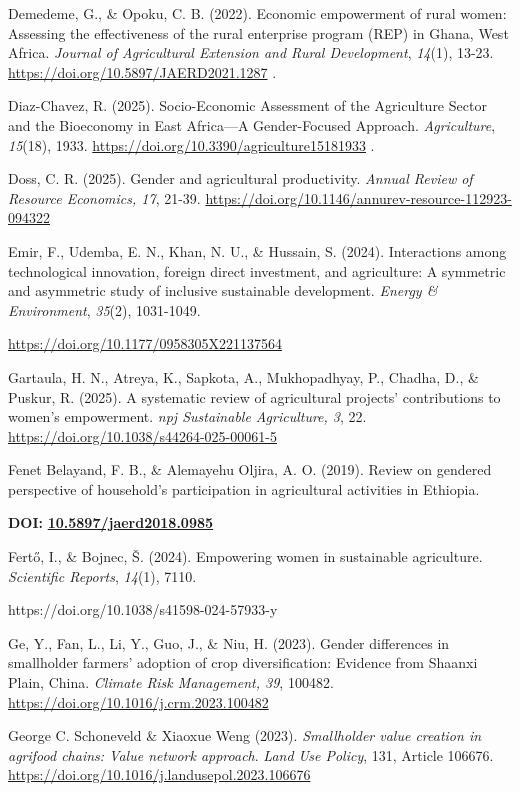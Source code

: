 \documentclass[
]{article}
\begin{document}
Demedeme, G., \& Opoku, C. B. (2022). Economic empowerment of rural
women: Assessing the effectiveness of the rural enterprise program (REP)
in Ghana, West Africa. \emph{Journal of Agricultural Extension and Rural
Development}, \emph{14}(1), 13-23.
\url{https://doi.org/10.5897/JAERD2021.1287} .

Diaz-Chavez, R. (2025). Socio-Economic Assessment of the Agriculture
Sector and the Bioeconomy in East Africa---A Gender-Focused Approach.
\emph{Agriculture}, \emph{15}(18), 1933.
\url{https://doi.org/10.3390/agriculture15181933} .

Doss, C. R. (2025). Gender and agricultural productivity. \emph{Annual
Review of Resource Economics, 17}, 21-39.
\url{https://doi.org/10.1146/annurev-resource-112923-094322}

Emir, F., Udemba, E. N., Khan, N. U., \& Hussain, S. (2024).
Interactions among technological innovation, foreign direct investment,
and agriculture: A symmetric and asymmetric study of inclusive
sustainable development. \emph{Energy \& Environment}, \emph{35}(2),
1031-1049.

\url{https://doi.org/10.1177/0958305X221137564}

Gartaula, H. N., Atreya, K., Sapkota, A., Mukhopadhyay, P., Chadha, D.,
\& Puskur, R. (2025). A systematic review of agricultural projects'
contributions to women's empowerment. \emph{npj Sustainable Agriculture,
3}, 22. \url{https://doi.org/10.1038/s44264-025-00061-5}

Fenet Belayand, F. B., \& Alemayehu Oljira, A. O. (2019). Review on
gendered perspective of household's participation in agricultural
activities in Ethiopia.

\textbf{DOI:}
\href{https://doi.org/10.5897/jaerd2018.0985}{\textbf{10.5897/jaerd2018.0985}}

Fertő, I., \& Bojnec, Š. (2024). Empowering women in sustainable
agriculture. \emph{Scientific Reports}, \emph{14}(1), 7110.

https://doi.org/10.1038/s41598-024-57933-y

Ge, Y., Fan, L., Li, Y., Guo, J., \& Niu, H. (2023). Gender differences
in smallholder farmers' adoption of crop diversification: Evidence from
Shaanxi Plain, China. \emph{Climate Risk Management, 39}, 100482.
\url{https://doi.org/10.1016/j.crm.2023.100482}

George C. Schoneveld \& Xiaoxue Weng (2023). \emph{Smallholder value
creation in agrifood chains: Value network approach}. \emph{Land Use
Policy}, 131, Article 106676.
\url{https://doi.org/10.1016/j.landusepol.2023.106676}
\end{document}
